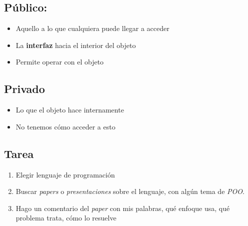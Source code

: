 \subsection{Público:}

\begin{itemize}
    \item Aquello a lo que cualquiera puede llegar a acceder
    \item La \textbf{interfaz} hacia el interior del objeto
    \item Permite operar con el objeto
\end{itemize}

\subsection{Privado}

\begin{itemize}
    \item Lo que el objeto hace internamente
    \item No tenemos cómo acceder a esto
\end{itemize}

\subsection{Tarea}
\begin{enumerate}
    \item Elegir lenguaje de programación 
    \item Buscar \textit{papers} o \textit{presentaciones} sobre el lenguaje,
    con algún tema de \textit{POO}.
    \item Hago un comentario del \textit{paper} con mis palabras,
    qué enfoque usa, qué problema trata, cómo lo resuelve
\end{enumerate}